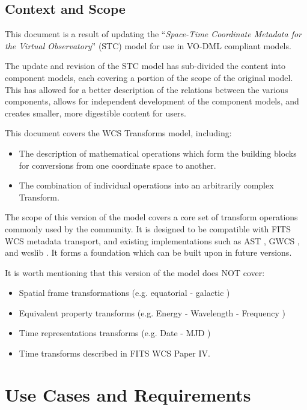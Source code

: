 \documentclass[11pt,a4paper]{ivoa}
\begin{document}
\subsection{Context and Scope}
This document is a result of updating the ``\emph{Space-Time Coordinate Metadata for the Virtual Observatory}'' (STC) \citep{std:STC} model for use in VO-DML compliant models.

The update and revision of the STC model has sub-divided the content into component 
models, each covering a portion of the scope of the original model.  This has 
allowed for a better description of the relations between the various components, 
allows for independent development of the component models, and creates smaller, 
more digestible content for users.

This document covers the WCS Transforms model, including:
\begin{itemize}
  \item The description of mathematical operations which form the building blocks for conversions from one coordinate space to another.
  \item The combination of individual operations into an arbitrarily complex Transform.
\end{itemize}

The scope of this version of the model covers a core set of transform operations commonly used by the community.
It is designed to be compatible with FITS WCS metadata transport, and existing implementations
such as AST \citep{soft:AST}, GWCS \citep{soft:GWCS}, and wcslib \citep{soft:WCSLIB}.
It forms a foundation which can be built upon in future versions.

It is worth mentioning that this version of the model does NOT cover:
\begin{itemize}
  \item Spatial frame transformations (e.g. equatorial - galactic )
  \item Equivalent property transforms (e.g. Energy - Wavelength - Frequency )
  \item Time representations transforms (e.g. Date - MJD )
  \item Time transforms described in FITS WCS Paper IV.
\end{itemize}


\section{Use Cases and Requirements}
\label{sect:ucreq}
\end{document}
